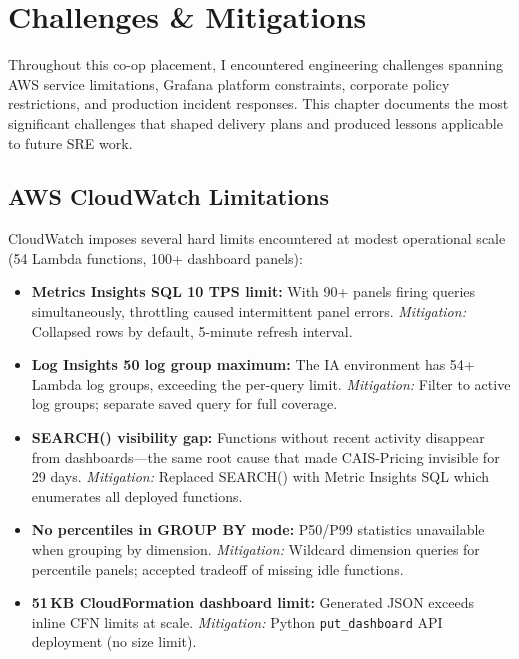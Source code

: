 ﻿%

\chapter{Challenges \& Mitigations}
\label{chap:challenges}

Throughout this co-op placement, I encountered engineering challenges spanning AWS
service limitations, Grafana platform constraints, corporate policy
restrictions, and production incident responses. This chapter documents the
most significant challenges that shaped delivery plans and produced lessons
applicable to future SRE work.


\FloatBarrier

\section{AWS CloudWatch Limitations}
\label{sec:challenges-cloudwatch}


CloudWatch imposes several hard limits encountered at modest operational scale
(54 Lambda functions, 100+ dashboard panels):

\begin{itemize}
    \item \textbf{Metrics Insights SQL 10 TPS limit:} With 90+ panels firing
          queries simultaneously, throttling caused intermittent panel errors.
          \textit{Mitigation:} Collapsed rows by default, 5-minute refresh interval.

    \item \textbf{Log Insights 50 log group maximum:} The IA environment has 54+
          Lambda log groups, exceeding the per-query limit.
          \textit{Mitigation:} Filter to active log groups; separate saved query
          for full coverage.

    \item \textbf{SEARCH() visibility gap:} Functions without recent activity
          disappear from dashboards---the same root cause that made CAIS-Pricing
          invisible for 29 days.
          \textit{Mitigation:} Replaced SEARCH() with Metric Insights SQL which
          enumerates all deployed functions.

    \item \textbf{No percentiles in GROUP BY mode:} P50/P99 statistics unavailable
          when grouping by dimension.
          \textit{Mitigation:} Wildcard dimension queries for percentile panels;
          accepted tradeoff of missing idle functions.

    \item \textbf{51\,KB CloudFormation dashboard limit:} Generated JSON exceeds
          inline CFN limits at scale.
          \textit{Mitigation:} Python \texttt{put\_dashboard} API deployment
          (no size limit).
\end{itemize}


